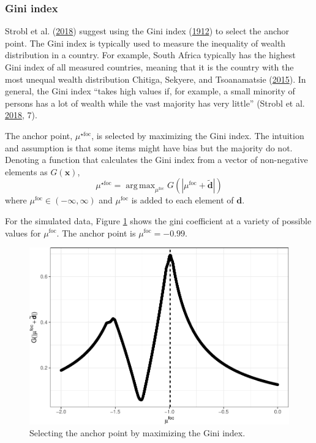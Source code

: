 \documentclass[
  11pt,
]{article}
\begin{document}
\hypertarget{gini-index}{%
\subsubsection{Gini index}\label{gini-index}}

Strobl et al. (\protect\hyperlink{ref-strobl2018anchor}{2018}) suggest using the Gini index (\protect\hyperlink{ref-gini1912variabilita}{1912}) to select the anchor point. The Gini index is typically used to measure the inequality of wealth distribution in a country. For example, South Africa typically has the highest Gini index of all measured countries, meaning that it is the country with the most unequal wealth distribution Chitiga, Sekyere, and Tsoanamatsie (\protect\hyperlink{ref-chitiga2015income}{2015}). In general, the Gini index \enquote{takes high values if, for example, a small minority of persons has a lot of wealth while the vast majority has very little} (Strobl et al. \protect\hyperlink{ref-strobl2018anchor}{2018}, 7).

The anchor point, \(\mu^{\star\text{foc}}\), is selected by maximizing the Gini index. The intuition and assumption is that some items might have bias but the majority do not. Denoting a function that calculates the Gini index from a vector of non-negative elements as \(G(\mathbf{x})\),\\
\[
\mu^{\star\text{foc}} = \mathop\mathrm{arg\,max}_{\mu^\text{foc}} G(|\mu^\text{foc} + \tilde{\mathbf{d}}|)
\]
where \(\mu^\text{foc} \in (-\infty, \infty)\) and \(\mu^\text{foc}\) is added to each element of \(\mathbf{d}\).

For the simulated data, Figure \ref{fig:ginipath} shows the gini coefficient at a variety of possible values for \(\mu^\text{foc}\). The anchor point is \(\mu^\text{foc} = -0.99\).

\begin{figure}[H]

{\centering \includegraphics[width=0.7\linewidth]{paper_files/figure-latex/ginipath-1} 

}

\caption{Selecting the anchor point by maximizing the Gini index.}\label{fig:ginipath}
\end{figure}
\end{document}
